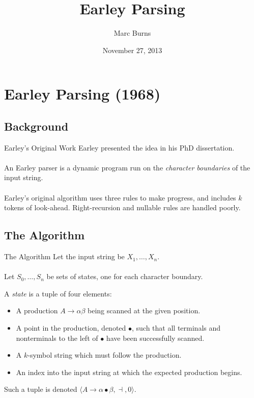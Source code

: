 \documentclass{beamer}
\begin{document}
\title[Earley Parsing]{Earley Parsing}
\author[m4burns]{Marc Burns}
\date[November 2013]{November 27, 2013}

\begin{frame}[plain]
  \titlepage
\end{frame}

\section{Earley Parsing (1968)}
\subsection{Background}
\begin{frame}{Earley's Original Work}
  Earley presented the idea in his PhD dissertation.\\~\\

  An Earley parser is a dynamic program run on the {\it character boundaries}
  of the input string.\\~\\

  Earley's original algorithm uses three rules to make progress, and includes $k$ tokens of look-ahead.
  Right-recursion and nullable rules are handled poorly.
\end{frame}

\subsection{The Algorithm}
\begin{frame}{The Algorithm}
  Let the input string be $X_1, \ldots, X_n$. \\~\\

  Let $S_0, \ldots, S_n$ be sets of states, one for each character boundary.

  A {\it state} is a tuple of four elements:
  \begin{itemize}
    \item A production $A \to \alpha\beta$ being scanned at the given position.
    \item A point in the production, denoted $\bullet$, such that all terminals and nonterminals to the left of $\bullet$ have been
      successfully scanned.
    \item A $k$-symbol string which must follow the production.
    \item An index into the input string at which the expected production begins.
  \end{itemize}

  Such a tuple is denoted $\langle A \to \alpha\bullet\beta, \dashv, 0 \rangle$.
\end{frame}
\end{document}
